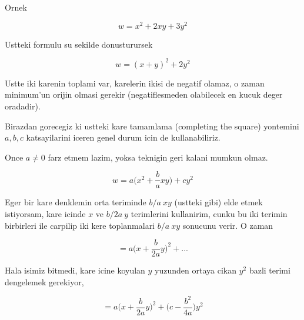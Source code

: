 \documentclass[12pt,fleqn]{article}
\begin{document}
Ornek

\[ w = x^2 + 2xy + 3y^2 \]

Ustteki formulu su sekilde donusturursek

\[ w = (x+y)^2 + 2y^2 \]

Ustte iki karenin toplami var, karelerin ikisi de negatif olamaz, o zaman
minimum'un orijin olmasi gerekir (negatiflesmeden olabilecek en kucuk deger
oradadir). 

Birazdan gorecegiz ki ustteki kare tamamlama (completing the square)
yontemini $a,b,c$ katsayilarini iceren genel durum icin de kullanabiliriz. 

Once $a \ne 0$ farz etmem lazim, yoksa teknigin geri kalani mumkun olmaz. 

\[ w = a \bigg( x^2 + \frac{b}{a} xy \bigg) + cy^2 \]

Eger bir kare denklemin orta teriminde $b/a \ xy$ (ustteki gibi) elde etmek
istiyorsam, kare icinde $x$ ve $b/2a \ y$ terimlerini kullanirim, cunku bu iki
terimin birbirleri ile carpilip iki kere toplanmalari $b/a \ xy$ sonucunu
verir. O zaman

\[ = a \bigg( x + \frac{b}{2a}y  \bigg)^2  + ... \]

Hala isimiz bitmedi, kare icine koyulan $y$ yuzunden ortaya cikan $y^2$ bazli
terimi dengelemek gerekiyor,

\[ = a \bigg( x + \frac{b}{2a}y  \bigg)^2  + 
\bigg( c - \frac{b^2}{4a} \bigg)y^2
 \]
\end{document}
